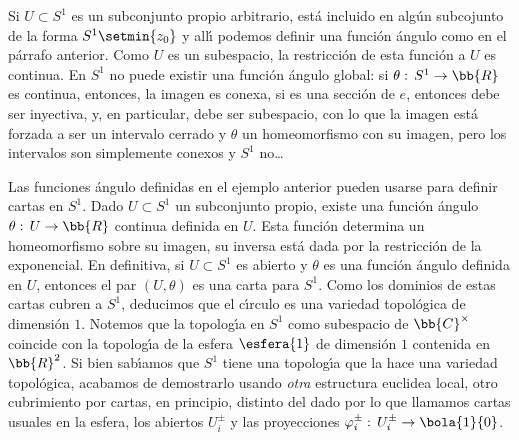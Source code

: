 \begin{ejemplo}
	Si $U\subset S^{1}$ es un subconjunto propio arbitrario, est\'{a}
	incluido en alg\'{u}n subcojunto de la forma $S^{1}\setmin\{z_{0}\}$
	y all\'{\i} podemos definir una funci\'{o}n \'{a}ngulo como
	en el p\'{a}rrafo anterior. Como $U$ es un subespacio, la
	restricci\'{o}n de esta funci\'{o}n a $U$ es continua.
	En $S^{1}$ no puede existir una funci\'{o}n \'{a}ngulo global:
	si $\theta:\,S^{1}\rightarrow\bb{R}$ es continua, entonces, la
	imagen es conexa, si es una secci\'{o}n de $e$, entonces debe ser
	inyectiva, y, en particular, debe ser subespacio, con lo que
	la imagen est\'{a} forzada a ser un intervalo cerrado y $\theta$
	un homeomorfismo con su imagen, pero los intervalos son simplemente
	conexos y $S^{1}$ no\dots
\end{ejemplo}

\begin{ejemplo}
	Las funciones \'{a}ngulo definidas en el ejemplo anterior pueden
	usarse para definir cartas en $S^{1}$. Dado $U\subset S^{1}$
	un subconjunto propio, existe una funci\'{o}n \'{a}ngulo
	$\theta:\,U\rightarrow\bb{R}$ continua definida en $U$. Esta
	funci\'{o}n determina un homeomorfismo sobre su imagen, su inversa
	est\'{a} dada por la restricci\'{o}n de la exponencial. En definitiva,
	si $U\subset S^{1}$ es abierto y $\theta$ es una funci\'{o}n
	\'{a}ngulo definida en $U$, entonces el par $(U,\theta)$ es una
	carta para $S^{1}$. Como los dominios de estas cartas cubren a
	$S^{1}$, deducimos que el c\'{\i}rculo es una variedad topol\'{o}gica
	de dimensi\'{o}n $1$. Notemos que la topolog\'{\i}a en $S^{1}$
	como subespacio de $\bb{C}^{\times}$ coincide con la topolog\'{\i}a
	de la esfera $\esfera{1}$ de dimensi\'{o}n $1$ contenida en
	$\bb{R}^{2}$. Si bien sab\'{\i}amos que $S^{1}$ tiene una
	topolog\'{\i}a que la hace una variedad topol\'{o}gica, acabamos
	de demostrarlo usando \emph{otra} estructura euclidea local, otro
	cubrimiento por cartas, en principio, distinto del dado por
	lo que llamamos cartas usuales en la esfera, los abiertos
	$U_{i}^{\pm}$ y las proyecciones
	$\varphi_{i}^{\pm}:\,U_{i}^{\pm}\rightarrow\bola{1}{0}$.


\end{ejemplo}
